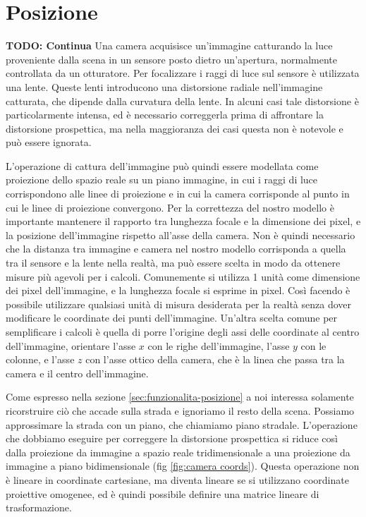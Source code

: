 \chapter{Posizione}
\label{sec:posizione}

\textbf{TODO: Continua}
Una camera acquisisce un'immagine catturando la luce proveniente dalla scena in un sensore posto dietro un'apertura, normalmente controllata da un otturatore.
Per focalizzare i raggi di luce sul sensore è utilizzata una lente.
Queste lenti introducono una distorsione radiale nell'immagine catturata, che dipende dalla curvatura della lente.
In alcuni casi tale distorsione è particolarmente intensa, ed è necessario correggerla prima di affrontare la distorsione prospettica, ma nella maggioranza dei casi questa non è notevole e può essere ignorata.

L'operazione di cattura dell'immagine può quindi essere modellata come proiezione dello spazio reale su un piano immagine, in cui i raggi di luce corrispondono alle linee di proiezione e in cui la camera corrisponde al punto in cui le linee di proiezione convergono.
Per la correttezza del nostro modello è importante mantenere il rapporto tra lunghezza focale e la dimensione dei pixel, e la posizione dell'immagine rispetto all'asse della camera.
Non è quindi necessario che la distanza tra immagine e camera nel nostro modello corrisponda a quella tra il sensore e la lente nella realtà, ma può essere scelta in modo da ottenere misure più agevoli per i calcoli.
Comunemente si utilizza 1 unità come dimensione dei pixel dell'immagine, e la lunghezza focale si esprime in pixel.
Così facendo è possibile utilizzare qualsiasi unità di misura desiderata per la realtà senza dover modificare le coordinate dei punti dell'immagine.
Un'altra scelta comune per semplificare i calcoli è quella di porre l'origine degli assi delle coordinate al centro dell'immagine, orientare l'asse $x$ con le righe dell'immagine, l'asse $y$ con le colonne, e l'asse $z$ con l'asse ottico della camera, che è la linea che passa tra la camera e il centro dell'immagine.

Come espresso nella sezione \ref{sec:funzionalita-posizione} a noi interessa solamente ricorstruire ciò che accade sulla strada e ignoriamo il resto della scena.
Possiamo approssimare la strada con un piano, che chiamiamo piano stradale.
L'operazione che dobbiamo eseguire per correggere la distorsione prospettica si riduce così dalla proiezione da immagine a spazio reale tridimensionale a una proiezione da immagine a piano bidimensionale (fig \ref{fig:camera coords}).
Questa operazione non è lineare in coordinate cartesiane, ma diventa lineare se si utilizzano coordinate proiettive omogenee, ed è quindi possibile definire una matrice lineare di trasformazione.

